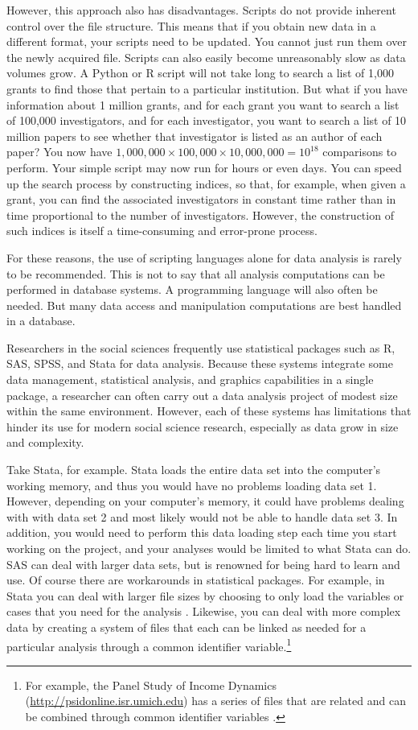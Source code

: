 \documentclass[]{krantz}
\begin{document}
However, this approach also has disadvantages. Scripts do not provide
inherent control over the file structure. This means that if you obtain
new data in a different format, your scripts need to be updated. You
cannot just run them over the newly acquired file. Scripts can also
easily become unreasonably slow as data volumes grow. A Python or R
script will not take long to search a list of 1,000 grants to find those
that pertain to a particular institution. But what if you have
information about 1 million grants, and for each grant you want to
search a list of 100,000 investigators, and for each investigator, you
want to search a list of 10 million papers to see whether that
investigator is listed as an author of each paper? You now have
\(1{,}000{,}000 \times 100{,}000 \times 10{,}000{,}000 = 10^{18}\)
comparisons to perform. Your simple script may now run for hours or even
days. You can speed up the search process by constructing indices, so
that, for example, when given a grant, you can find the associated
investigators in constant time rather than in time proportional to the
number of investigators. However, the construction of such indices is
itself a time-consuming and error-prone process.

For these reasons, the use of scripting languages alone for data
analysis is rarely to be recommended. This is not to say that all
analysis computations can be performed in database systems. A
programming language will also often be needed. But many data access and
manipulation computations are best handled in a database.

Researchers in the social sciences frequently use statistical packages
such as R, SAS, SPSS, and Stata for data analysis. Because these systems
integrate some data management, statistical analysis, and graphics
capabilities in a single package, a researcher can often carry out a
data analysis project of modest size within the same environment.
However, each of these systems has limitations that hinder its use for
modern social science research, especially as data grow in size and
complexity.

Take Stata, for example. Stata loads the entire data set into the
computer's working memory, and thus you would have no problems loading
data set 1. However, depending on your computer's memory, it could have
problems dealing with with data set 2 and most likely would not be able
to handle data set 3. In addition, you would need to perform this data
loading step each time you start working on the project, and your
analyses would be limited to what Stata can do. SAS can deal with larger
data sets, but is renowned for being hard to learn and use. Of course
there are workarounds in statistical packages. For example, in Stata you
can deal with larger file sizes by choosing to only load the variables
or cases that you need for the analysis \citep{kohler2012datenanalyse}.
Likewise, you can deal with more complex data by creating a system of
files that each can be linked as needed for a particular analysis
through a common identifier variable.\footnote{For example, the Panel
  Study of Income Dynamics (\url{http://psidonline.isr.umich.edu}) has a
  series of files that are related and can be combined through common
  identifier variables \citep{PSIDguide}.}
\end{document}
